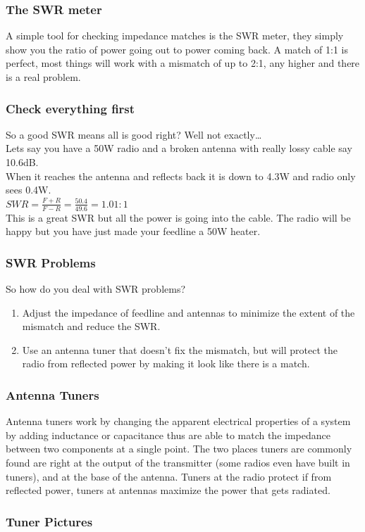 \documentclass[10pt]{beamer}
\begin{document}
\begin{frame}
\frametitle{The SWR meter}
A simple tool for checking impedance matches is the SWR meter, they simply show you the ratio of power going out to power coming back. A match of 1:1 is perfect, most things will work with a mismatch of up to 2:1, any higher and there is a real problem.
\end{frame}

\begin{frame}
\frametitle{Check everything first}
So a good SWR means all is good right? \pause Well not exactly\ldots \\\pause
Lets say you have a 50W radio and a broken antenna with really lossy cable say 10.6dB.\\
When it reaches the antenna and reflects back it is down to 4.3W and radio only sees 0.4W.\\
$SWR=\frac{F+R}{F-R}=\frac{50.4}{49.6}=1.01:1$\\
This is a great SWR but all the power is going into the cable. The radio will be happy but you have just made your feedline a 50W heater.
\end{frame}

\begin{frame}
\frametitle{SWR Problems}
So how do you deal with SWR problems?\\
\begin{enumerate}
\item Adjust the impedance of feedline and antennas to minimize the extent of the mismatch and reduce the SWR.
\item Use an antenna tuner that doesn't fix the mismatch, but will protect the radio from reflected power by making it look like there is a match.
\end{enumerate}
\end{frame}

\begin{frame}
\frametitle{Antenna Tuners}
Antenna tuners work by changing the apparent electrical properties of a system by adding inductance or capacitance thus are able to match the impedance between two components at a single point. The two places tuners are commonly found are right at the output of the transmitter (some radios even have built in tuners), and at the base of the antenna. Tuners at the radio protect if from reflected power, tuners at antennas maximize the power that gets radiated.
\end{frame}

\begin{frame}
\frametitle{Tuner Pictures}

\end{frame}
\end{document}
